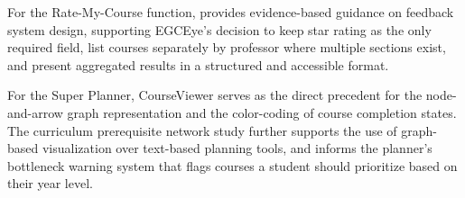 For the Rate-My-Course function, \cite{paper_14} provides evidence-based guidance on feedback system design, supporting EGCEye's decision to keep star rating as the only required field, list courses separately by professor where multiple sections exist, and present aggregated results in a structured and accessible format.

For the Super Planner, CourseViewer \cite{paper_15} serves as the direct precedent for the node-and-arrow graph representation and the color-coding of course completion states. The curriculum prerequisite network study \cite{paper_13} further supports the use of graph-based visualization over text-based planning tools, and informs the planner's bottleneck warning system that flags courses a student should prioritize based on their year level.
